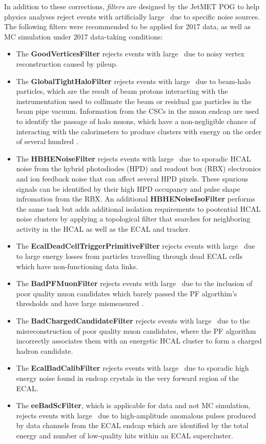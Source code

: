 In addition to these corrections, \textit{filters} are designed by the JetMET POG to help physics analyses reject events with artificially large \pTmiss\ due to specific noise sources. The following filters were recommended to be applied for 2017 data, as well as MC simulation under 2017 data-taking conditions:
\begin{itemize}
  \item The \textbf{GoodVerticesFilter} rejects events with large \pTmiss\ due to noisy vertex reconstruction caused by pileup. 
  \item The \textbf{GlobalTightHaloFilter} rejects events with large \pTmiss\ due to beam-halo particles, which are the result of beam protons interacting with the instrumentation used to collimate the beam or residual gas particles in the beam pipe vacuum. Information from the CSCs in the muon endcap are used to identify the passage of halo muons, which have a non-negligible chance of interacting with the calorimeters to produce clusters with energy on the order of several hundred \GeV.
  \item The \textbf{HBHENoiseFilter} rejects events with large \pTmiss\ due to sporadic HCAL noise from the hybrid photodiodes (HPD) and readout box (RBX) electronics and ion feedback noise that can affect several HPD pixels. These spurious signals can be identified by their high HPD occupancy and pulse shape infromation from the RBX. An additional \textbf{HBHENoiseIsoFilter} performs the same task but adds additional isolation requirements to pootential HCAL noise clusters by applying a topological filter that searches for neighboring activity in the HCAL as well as the ECAL and tracker.
  \item The \textbf{EcalDeadCellTriggerPrimitiveFilter} rejects events with large \pTmiss\ due to large energy losses from particles travelling through dead ECAL cells which have non-functioning data links.
  \item The \textbf{BadPFMuonFilter} rejects events with large \pTmiss\ due to the inclusion of poor quality muon candidates which barely passed the PF algorthim's thresholds and have large mismeasured \pT.
  \item The \textbf{BadChargedCandidateFilter} rejects events with large \pTmiss\ due to the misreconstruction of poor quality muon candidates, where the PF algorithm incorrectly associates them with an energetic HCAL cluster to form a charged hadron candidate.
  \item The \textbf{EcalBadCalibFilter} rejects events with large \pTmiss\ due to sporadic high energy noise found in endcap crystals in the very forward region of the ECAL.
  \item The \textbf{eeBadScFilter}, which is applicable for data and not MC simulation, rejects events with large \pTmiss\ due to high-amplitude anomalous pulses produced by data channels from the ECAL endcap which are identified by the total energy and number of low-quality hits within an ECAL supercluster.
\end{itemize}

